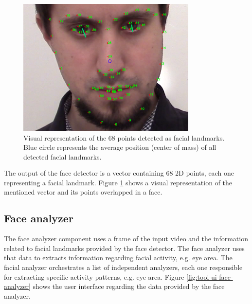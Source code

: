 \begin{figure}
    \centering
    \includegraphics[width=0.8\textwidth]{figures/tool-ui-face-detector.png}
    \caption{Visual representation of the 68 points detected as facial landmarks. Blue circle represents the average position (center of mass) of all detected facial landmarks.}
    \label{fig:tool-ui-face-detector}
\end{figure}

The output of the face detector is a vector containing 68 2D points, each one representing a facial landmark. Figure \ref{fig:tool-ui-face-detector} shows a visual representation of the mentioned vector and its points overlapped in a face.

\subsection{Face analyzer}

The face analyzer component uses a frame of the input video and the information related to facial landmarks provided by the face detector. The face analyzer uses that data to extracts information regarding facial activity, e.g. eye area. The facial analyzer orchestrates a list of independent analyzers, each one responsible for extracting specific activity patterns, e.g. eye area. Figure \ref{fig:tool-ui-face-analyzer} shows the user interface regarding the data provided by the face analyzer.

